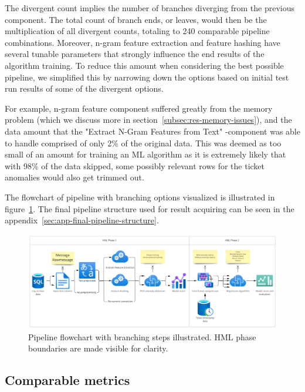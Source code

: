 The divergent count implies the number of branches
diverging from the previous component.
The total count of branch ends, or leaves,
would then be the multiplication of all divergent counts,
totaling to 240 comparable pipeline combinations.
Moreover,
n-gram feature extraction and feature hashing
have several tunable parameters
that strongly influence the end results of the algorithm training.
To reduce this amount when considering the best possible pipeline,
we simplified this by narrowing down the options
based on initial test run results of some of the divergent options.

For example,
n-gram feature component suffered greatly from the memory problem
(which we discuss more in section~\ref{subsec:res-memory-issues}),
and the data amount that the "Extract N-Gram Features from Text" -component was able to handle
comprised of only 2\% of the original data.
This was deemed as too small of an amount for training an ML algorithm
as it is extremely likely that with 98\% of the data skipped,
some possibly relevant rows for the ticket anomalies would also get trimmed out.

The flowchart of pipeline with branching options visualized
is illustrated in figure~\ref{fig:pipeline-flowchart}.
The final pipeline structure used for result acquiring
can be seen in the appendix~\ref{sec:app-final-pipeline-structure}.
\begin{figure}[htb]
    \centering
    \includegraphics[width=\textwidth]{./appendices/pipeline-flowchart.jpg}
    \caption{Pipeline flowchart with branching steps illustrated.
    HML phase boundaries are made visible for clarity.
    \label{fig:pipeline-flowchart}}
\end{figure}




\subsection{Comparable metrics}\label{subsec:pipe-comparable-metrics}

